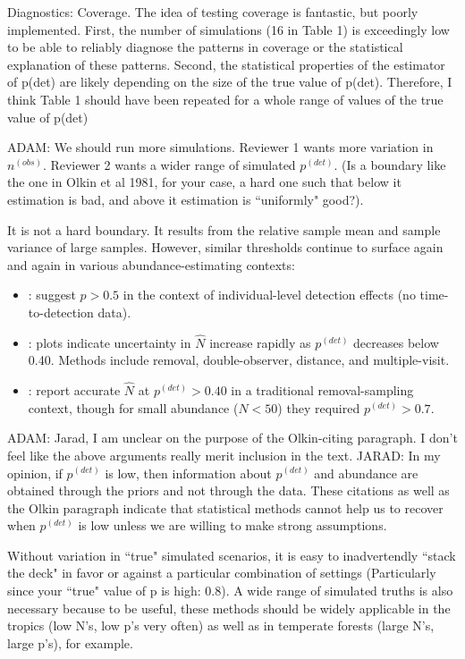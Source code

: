 \documentclass[12pt]{article}
\renewenvironment{quote}  %
              {\list{}{\rightmargin\leftmargin}\normalfont%
               \item\relax}
              {\endlist}
\newcommand{\adam}[1]{{\color{blue} ADAM: #1}}
\newcommand{\jarad}[1]{{\color{Orange} JARAD: #1}}
\newcommand{\pdet}{p^{(det)}}
\begin{document}
Diagnostics: Coverage. The idea of testing coverage is fantastic, but poorly implemented. First, the number of simulations (16 in Table 1) is exceedingly low to be able to reliably diagnose the patterns in coverage or the statistical explanation of these patterns. Second, the statistical properties of the estimator of p(det) are likely depending on the size of the true value of p(det). Therefore, I think Table 1 should have been repeated for a whole range of values of the true value of p(det)
\begin{quote}
\adam{We should run more simulations.  Reviewer 1 wants more variation in $n^{(obs)}$.  Reviewer 2 wants a wider range of simulated $\pdet$.}
\end{quote}
(Is a boundary like the one in Olkin et al 1981, for your case, a hard one such that below it estimation is bad, and above it estimation is ``uniformly" good?).
\begin{quote}
It is not a hard boundary.  It results from the relative sample mean and sample variance of large samples.
However, similar thresholds continue to surface again and again in various abundance-estimating contexts: 
\begin{itemize}
\item \citet{Veech2016}: suggest  $p>0.5$ in the context of individual-level detection effects (no time-to-detection data). 
\item \citet{Field2016}: plots indicate uncertainty in $\hat{N}$ increase rapidly as $\pdet$ decreases below 0.40.  Methods include removal, double-observer, distance, and multiple-visit.
\item \citet{Davis2016}: report accurate $\hat{N}$ at $\pdet >0.40$ in a traditional removal-sampling context, though for small abundance ($N<50$) they required $\pdet > 0.7$.
\end{itemize}
\adam{Jarad, I am unclear on the purpose of the Olkin-citing paragraph.  I don't feel like the above arguments really merit inclusion in the text.}
\jarad{In my opinion, if $\pdet$ is low, then information about $\pdet$ and abundance are 
obtained through the priors and not through the data. These citations as well as the Olkin paragraph
indicate that statistical methods cannot help us to recover when $\pdet$ is low unless we 
are willing to make strong assumptions.}
\end{quote}

 Without variation in ``true" simulated scenarios, it is easy to inadvertendly ``stack the deck" in favor or against a particular combination of settings (Particularly since your ``true" value of p is high: 0.8). A wide range of simulated truths is also necessary because to be useful, these methods should be widely applicable in the
tropics (low N's, low p's very often) as well as in temperate forests (large N's, large p's), for example.
\end{document}
